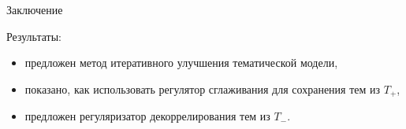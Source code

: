 \documentclass{beamer}
\begin{document}
\begin{frame}{Заключение}
    \begin{block}{Результаты:}
    \begin{itemize}
        \item предложен метод итеративного улучшения тематической модели,
        \item показано, как использовать регулятор сглаживания для сохранения тем из $T_+$,
        \item предложен регуляризатор декоррелирования тем из $T_-$.
        
    \end{itemize}
    \end{block}
\end{frame}
\end{document}
